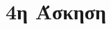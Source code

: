 \documentclass[assignment3.tex]{subfiles}
\begin{document}
\section*{4η Άσκηση}




%
\end{document}
